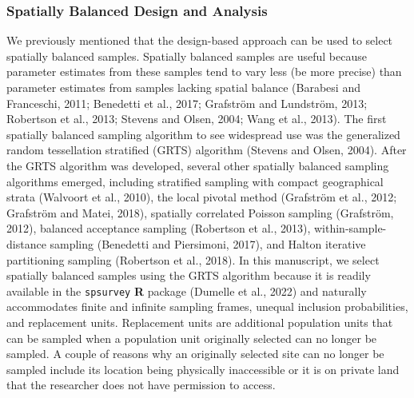 \documentclass[]{elsarticle} %
\begin{document}
\hypertarget{subsec:spb_design}{%
\subsubsection{Spatially Balanced Design and
Analysis}\label{subsec:spb_design}}

We previously mentioned that the design-based approach can be used to
select spatially balanced samples. Spatially balanced samples are useful
because parameter estimates from these samples tend to vary less (be
more precise) than parameter estimates from samples lacking spatial
balance (Barabesi and Franceschi, 2011; Benedetti et al., 2017;
Grafström and Lundström, 2013; Robertson et al., 2013; Stevens and
Olsen, 2004; Wang et al., 2013). The first spatially balanced sampling
algorithm to see widespread use was the generalized random tessellation
stratified (GRTS) algorithm (Stevens and Olsen, 2004). After the GRTS
algorithm was developed, several other spatially balanced sampling
algorithms emerged, including stratified sampling with compact
geographical strata (Walvoort et al., 2010), the local pivotal method
(Grafström et al., 2012; Grafström and Matei, 2018), spatially
correlated Poisson sampling (Grafström, 2012), balanced acceptance
sampling (Robertson et al., 2013), within-sample-distance sampling
(Benedetti and Piersimoni, 2017), and Halton iterative partitioning
sampling (Robertson et al., 2018). In this manuscript, we select
spatially balanced samples using the GRTS algorithm because it is
readily available in the \texttt{spsurvey} \textbf{\textsf{R}} package
(Dumelle et al., 2022) and naturally accommodates finite and infinite
sampling frames, unequal inclusion probabilities, and replacement units.
Replacement units are additional population units that can be sampled
when a population unit originally selected can no longer be sampled. A
couple of reasons why an originally selected site can no longer be
sampled include its location being physically inaccessible or it is on
private land that the researcher does not have permission to access.
\end{document}
